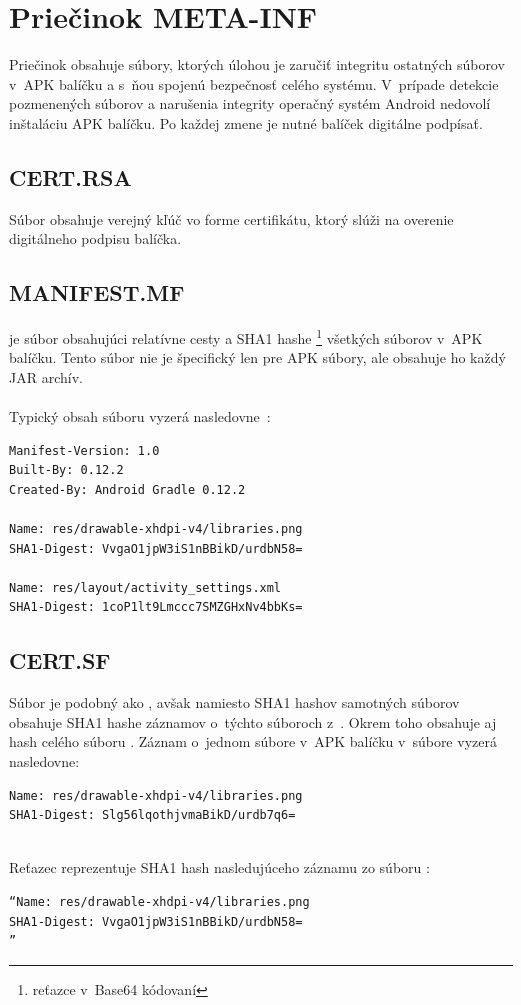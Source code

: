 \section{Priečinok META-INF}
\label{META-INF}
Priečinok  obsahuje súbory, ktorých úlohou je zaručiť integritu ostatných súborov v~APK balíčku a s~ňou spojenú bezpečnosť celého systému. V~prípade detekcie pozmenených súborov a narušenia integrity operačný systém Android nedovolí inštaláciu APK balíčku. Po každej zmene je nutné balíček digitálne podpísať.

\subsection*{CERT.RSA}
\label{CERT.RSA} 
Súbor  obsahuje verejný kľúč vo forme  certifikátu, ktorý slúži na overenie digitálneho podpisu balíčka.
\subsection*{MANIFEST.MF}
\label{MANIFEST.MF}
 je súbor obsahujúci relatívne cesty a SHA1 hashe \footnote{reťazce v~Base64 kódovaní} všetkých súborov v~APK balíčku. Tento súbor nie je špecifický len pre APK súbory, ale obsahuje ho každý JAR archív.\\\\
Typický obsah súboru  vyzerá nasledovne~\cite{Yang2015}: \\
\begin{verbatim}
Manifest-Version: 1.0
Built-By: 0.12.2
Created-By: Android Gradle 0.12.2

Name: res/drawable-xhdpi-v4/libraries.png
SHA1-Digest: VvgaO1jpW3iS1nBBikD/urdbN58=

Name: res/layout/activity_settings.xml
SHA1-Digest: 1coP1lt9Lmccc7SMZGHxNv4bbKs=
\end{verbatim}
\subsection*{CERT.SF}
\label{CERT.SF}
Súbor  je podobný ako , avšak namiesto SHA1 hashov samotných súborov obsahuje SHA1 hashe záznamov o~týchto súboroch z~. Okrem toho obsahuje aj hash celého súboru . \newline Záznam o~jednom súbore v~APK balíčku v~súbore  vyzerá nasledovne: \newline
\begin{verbatim}
Name: res/drawable-xhdpi-v4/libraries.png
SHA1-Digest: Slg56lqothjvmaBikD/urdb7q6=
\end{verbatim}\mbox{}\\
Reťazec  reprezentuje SHA1 hash nasledujúceho záznamu zo súboru :\mbox{}\\
\begin{verbatim}
“Name: res/drawable-xhdpi-v4/libraries.png
SHA1-Digest: VvgaO1jpW3iS1nBBikD/urdbN58=
”\end{verbatim}
